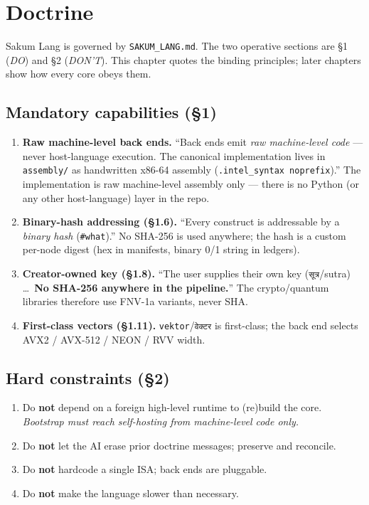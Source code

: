 \section{Doctrine}\label{ch:doctrine}

Sakum Lang is governed by \texttt{SAKUM\_LANG.md}.  The two operative
sections are \S1 (\emph{DO}) and \S2 (\emph{DON'T}).  This chapter quotes the
binding principles; later chapters show how every core obeys them.

\subsection{Mandatory capabilities (\S1)}

\begin{enumerate}[label=\S1.\arabic*]
\item \textbf{Raw machine-level back ends.} ``Back ends emit \emph{raw
  machine-level code} --- never host-language execution.  The canonical
  implementation lives in \texttt{assembly/} as handwritten x86-64 assembly
  (\texttt{.intel\_syntax noprefix}).''  The implementation is raw
  machine-level assembly only --- there is no Python (or any other
  host-language) layer in the repo. \cite{SAKUM}
\item \textbf{Binary-hash addressing (\S1.6).} ``Every construct is
  addressable by a \emph{binary hash} (\texttt{\#what}).''  No SHA-256 is
  used anywhere; the hash is a custom per-node digest (hex in manifests,
  binary 0/1 string in ledgers). \cite{SAKUM}
\item \textbf{Creator-owned key (\S1.8).} ``The user supplies their own key
  (\texttt{सूत्र}/sutra) \ldots\ \textbf{No SHA-256 anywhere in the
  pipeline.}''  The crypto/quantum libraries therefore use FNV-1a variants,
  never SHA. \cite{SAKUM}
\item \textbf{First-class vectors (\S1.11).} \texttt{vektor}/\texttt{वेक्टर}
  is first-class; the back end selects AVX2 / AVX-512 / NEON / RVV width.
  \cite{SAKUM}
\end{enumerate}

\subsection{Hard constraints (\S2)}

\begin{enumerate}[label=\S2.\arabic*]
\item Do \textbf{not} depend on a foreign high-level runtime to (re)build the
  core.  \emph{Bootstrap must reach self-hosting from machine-level code
  only.} \cite{SAKUM}
\item Do \textbf{not} let the AI erase prior doctrine messages; preserve and
  reconcile. \cite{SAKUM}
\item Do \textbf{not} hardcode a single ISA; back ends are pluggable.
  \cite{SAKUM}
\item Do \textbf{not} make the language slower than necessary. \cite{SAKUM}
\end{enumerate}

